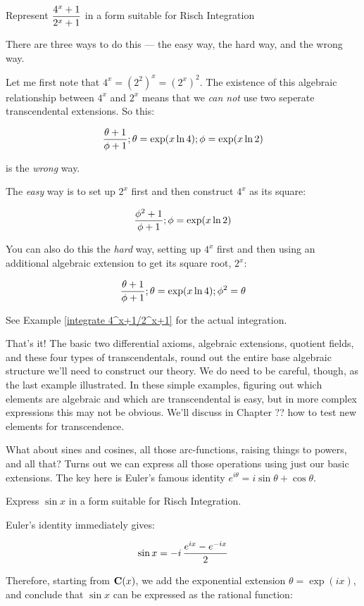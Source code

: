 \example Represent $\displaystyle {{4^x+1}\over{2^x+1}}$ in a form
suitable for Risch Integration\label{represent 4^x+1/2^x+1}

There are three ways to do this --- the easy way, the hard way, and
the wrong way.

Let me first note that $4^x = (2^2)^x = (2^x)^2$.  The existence of
this algebraic relationship between $4^x$ and $2^x$ means that we {\it
can not} use two seperate transcendental extensions.  So this:

$${{\theta+1}\over{\phi+1}}; \theta = \exp(x \ln 4); \phi = \exp(x \ln 2)$$

is the {\it wrong} way.

The {\it easy} way is to set up $2^x$ first and then construct $4^x$
as its square:

$${{\phi^2+1}\over{\phi+1}}; \phi = \exp(x \ln 2)$$

You can also do this the {\it hard} way, setting up $4^x$ first and
then using an additional algebraic extension to get its square root,
$2^x$:

$${{\theta+1}\over{\phi+1}}; \theta = \exp(x \ln 4); \phi^2 = \theta$$

See Example \ref{integrate 4^x+1/2^x+1} for the actual integration.

\endexample

That's it!  The basic two differential axioms, algebraic extensions,
quotient fields, and these four types of transcendentals, round out
the entire base algebraic structure we'll need to construct our
theory.  We do need to be careful, though, as the last example
illustrated.  In these simple examples, figuring out which elements
are algebraic and which are transcendental is easy, but in more
complex expressions this may not be obvious.  We'll discuss in Chapter
?? how to test new elements for transcendence.

What about sines and cosines, all those arc-functions, raising things
to powers, and all that?  Turns out we can express all those
operations using just our basic extensions.  The key here is Euler's
famous identity $e^{i\theta}=i\sin\theta+\cos\theta$.

\example

Express $\sin x$ in a form suitable for Risch Integration.

Euler's identity immediately gives:

$$\sin x = {-i \,{{e^{ix} - e^{-ix}}\over 2}}$$

Therefore, starting from ${\bf C}(x)$,
we add the exponential extension $\theta = \exp(ix)$,
and conclude that $\sin x$ can be expressed as the rational function:

